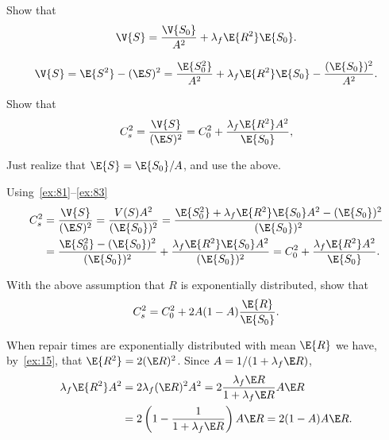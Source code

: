 \begin{exercise}\label{ex:83}
Show that
 \begin{equation*}
 \V{S} = \frac{\V{S_0}}{A^2} + \lambda_f \E{R^2} \E{S_0}.
 \end{equation*}
\begin{solution}
 \begin{equation*}
 \V{S} = \E{S^2} - (\E S)^2 =
\frac{\E{S_0^2}}{A^2} + \lambda_f \E{R^2} \E{S_0} -\frac{(\E{S_0})^2}{A^2}.
 \end{equation*}
\end{solution}
\end{exercise}

\begin{exercise}\label{ex:l-160}
Show that
 \begin{equation*}
 C_s^2 = \frac{\V{S}}{(\E S)^2} = C_0^2 + \frac{\lambda_f \E{R^2} A^2}{\E{S_0}},
 \end{equation*}
\begin{hint} Just realize that $\E{S} = \E{S_0}/A$, and use the above.
\end{hint}
\begin{solution} Using~\cref{ex:81}--\cref{ex:83}
 \begin{align*}
C_s^2 &= \frac{\V{S}}{(\E S)^2} =\frac{V(S) A^2}{(\E{S_0})^2}
=\frac{\E{S_0^2} + \lambda_f \E{R^2} \E{S_0}A^2 -(\E{S_0})^2}{(\E{S_0})^2} \\
&=\frac{\E{S_0^2} -(\E{S_0})^2}{(\E{S_0})^2} + \frac{\lambda_f \E{R^2} \E{S_0}A^2}{(\E{S_0})^2}
=C_0^2 + \frac{\lambda_f \E{R^2}A^2}{\E{S_0}}.
 \end{align*}
\end{solution}
\end{exercise}


\begin{exercise}\label{ex:l-161}
With the above assumption that $R$ is exponentially distributed, show that
 \begin{equation*}
 C_s^2 = C_0^2 + 2 A(1-A) \frac{\E{R}}{\E{S_0}}.
 \end{equation*}
\begin{solution}
When repair times are exponentially distributed with mean $\E{R}$ we have, by~\cref{ex:15}, that  $\E{R^2}=2(\E R)^2$.
Since $A=1/(1+\lambda_f \E R)$,
 \begin{equation*}
 \begin{split}
 \lambda_f \E{R^2} A^2
&= 2\lambda_f (\E R)^2 A^2
= 2 \frac{\lambda_f \E R }{1+\lambda_f \E R} A \E R \\
&= 2 \left(1-\frac{1}{1+\lambda_f \E R}\right) A \E R = 2(1-A)A \E R.
 \end{split}
 \end{equation*}
\end{solution}
\end{exercise}




